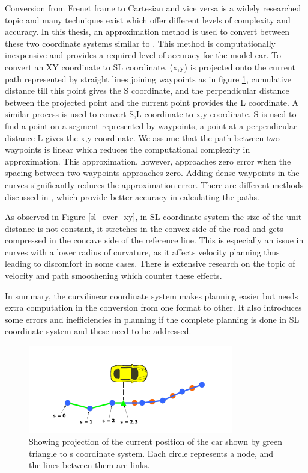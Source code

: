  Conversion from Frenet frame to Cartesian and vice versa is a widely researched topic and many techniques exist which offer different levels of complexity and accuracy. In this thesis, an approximation method is used to convert between these two coordinate systems similar to \cite{volvo_reactive_traj}. This method is computationally inexpensive and provides a required level of accuracy for the model car. To convert an XY coordinate to SL coordinate, (x,y) is projected onto the current path represented by straight lines joining waypoints as in figure \ref{xy_sl_conversion}, cumulative distance till this point gives the S coordinate, and the perpendicular distance between the projected point and the current point provides the L coordinate. A similar process is used to convert S,L coordinate to x,y coordinate. S is used to find a point on a segment represented by waypoints, a point at a perpendicular distance L gives the x,y coordinate. We assume that the path between two waypoints is linear which reduces the computational complexity in approximation. This approximation, however, approaches zero error when the spacing between two waypoints approaches zero. Adding dense waypoints in the curves significantly reduces the approximation error. There are different methods discussed in \cite{lengthparameterized}, \cite{Wangrobustand} which provide better accuracy in calculating the paths. 

As observed in Figure \ref{sl_over_xy}, in SL coordinate system the size of the unit distance is not constant, it stretches in the convex side of the road and gets compressed in the concave side of the reference line. This is especially an issue in curves with a lower radius of curvature, as it affects velocity planning thus leading to discomfort in some cases. There is extensive research on the topic of velocity and path smoothening which counter these effects. 

In summary, the curvilinear coordinate system makes planning easier but needs extra computation in the conversion from one format to other. It also introduces some errors and inefficiencies in planning if the complete planning is done in SL coordinate system and these need to be addressed. 
 
 \begin{figure}[H]
    \centering
    \includegraphics[width=0.8\textwidth]{Images/xy_sl_conversion.png}
    \caption{Showing projection of the current position of the car shown by green triangle to s coordinate system. Each circle represents a node, and the lines between them are links. \cite{volvo_reactive_traj}}
    \label{xy_sl_conversion}
\end{figure}


